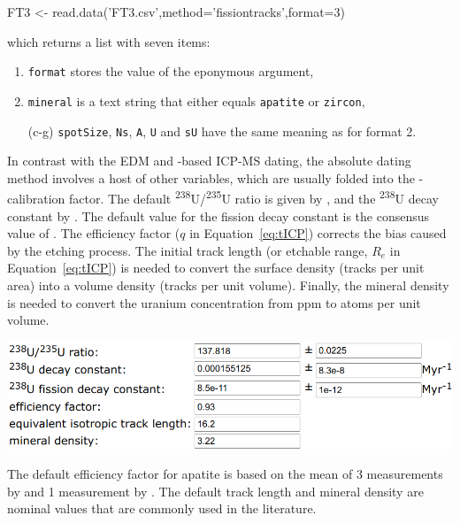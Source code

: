 \begin{refsection}
\begin{enumerate}
\begin{console}
FT3 <- read.data('FT3.csv',method='fissiontracks',format=3)
\end{console}

\noindent which returns a list with seven items:

\begin{enumerate}
\item\texttt{format} stores the value of the eponymous argument,
\item\texttt{mineral} is a text string that either equals
  \texttt{apatite} or \texttt{zircon},
\item[(c-g)]\texttt{spotSize}, \texttt{Ns}, \texttt{A},
  \texttt{U} and \texttt{sU} have the same meaning as for format 2.
\end{enumerate}

In contrast with the EDM and \textzeta-based ICP-MS dating, the
absolute dating method involves a host of other variables, which are
usually folded into the \textzeta-calibration factor. The default
\textsuperscript{238}U/\textsuperscript{235}U ratio is given by
\citet{hiess2012}, and the \textsuperscript{238}U decay constant by
\citet{jaffey1971}. The default value for the fission decay constant
is the consensus value of \citet{holden2000}.  The efficiency factor
($q$ in Equation~\ref{eq:tICP}) corrects the bias caused by the
etching process. The initial track length (or etchable range, $R_e$ in
Equation~\ref{eq:tICP}) is needed to convert the surface density
(tracks per unit area) into a volume density (tracks per unit
volume). Finally, the mineral density is needed to convert the uranium
concentration from ppm to atoms per unit volume.

\begin{center}
\includegraphics[width=.8\linewidth]{../figures/FTlambda.png}
\end{center}

The default efficiency factor for apatite is based on the mean of 3
measurements by \citet{iwano1998} and 1 measurement by
\citet{jonckheere2003b}. The default track length and mineral density
are nominal values that are commonly used in the literature.


\end{enumerate}
\end{refsection}
